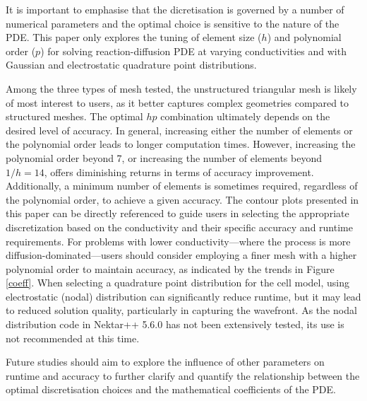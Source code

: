 It is important to emphasise that the dicretisation is governed by a number of numerical parameters and the optimal choice is sensitive to the nature of the PDE. This paper only explores the tuning of element size ($h$) and polynomial order ($p$) for solving reaction-diffusion PDE at varying conductivities and with Gaussian and electrostatic quadrature point distributions. 
\par
Among the three types of mesh tested, the unstructured triangular mesh is likely of most interest to users, as it better captures complex geometries compared to structured meshes. The optimal $hp$ combination ultimately depends on the desired level of accuracy. In general, increasing either the number of elements or the polynomial order leads to longer computation times. However, increasing the polynomial order beyond 7, or increasing the number of elements beyond $1/h = 14$, offers diminishing returns in terms of accuracy improvement. Additionally, a minimum number of elements is sometimes required, regardless of the polynomial order, to achieve a given accuracy. The contour plots presented in this paper can be directly referenced to guide users in selecting the appropriate discretization based on the conductivity and their specific accuracy and runtime requirements. For problems with lower conductivity—where the process is more diffusion-dominated—users should consider employing a finer mesh with a higher polynomial order to maintain accuracy, as indicated by the trends in Figure \ref{coeff}. When selecting a quadrature point distribution for the cell model, using electrostatic (nodal) distribution can significantly reduce runtime, but it may lead to reduced solution quality, particularly in capturing the wavefront. As the nodal distribution code in Nektar++ 5.6.0 has not been extensively tested, its use is not recommended at this time.
\par
Future studies should aim to explore the influence of other parameters on runtime and accuracy to further clarify and quantify the relationship between the optimal discretisation choices and the mathematical coefficients of the PDE. 